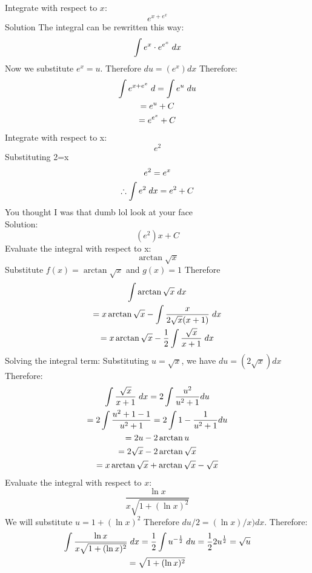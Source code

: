 \documentclass{article}
\begin{document}
Integrate with respect to $x$: $$e^{x+e^{x}}$$
Solution
The integral can be rewritten this way:
$$\int e^x\cdot e^{e^{x}}\hspace{1mm}dx$$
Now we substitute $e^x=u$. Therefore $du=(e^x)dx$
Therefore:
\begin{gather*}
   \int e^{x+e^{x}} \hspace{1mm}d=\int e^u\hspace{1mm}du
   \\=e^u+C
   \\=e^{e^x}+C
\end{gather*}
Integrate with respect to x: $$e^2$$
Substituting 2=x
\begin{gather*}
    e^2=e^x
    \\\therefore \int e^2 \hspace{1mm}dx=e^2+C
\end{gather*}
You thought I was that dumb lol look at your face
\\Solution:$$(e^2)x+C$$
Evaluate the integral with respect to x:$$\arctan{\sqrt{x}}$$
Substitute $f(x)=\arctan{\sqrt{x}}$ and $g(x)=1$
Therefore
\begin{gather*}
\int \arctan{\sqrt{x}} \hspace{1mm}dx
\\=x\arctan{\sqrt{x}}-\int \frac{x}{2\sqrt{x}(x+1)} \hspace{1mm}dx
\\=x\arctan{\sqrt{x}}-\frac{1}{2}\int \frac{\sqrt{x}}{x+1}\hspace{1mm}dx
\end{gather*}
Solving the integral term:
Substituting $u=\sqrt{x}$, we have $du=(2\sqrt{x})dx$ Therefore:
\begin{gather*}
\int \frac{\sqrt{x}}{x+1}\hspace{1mm}dx=2\int\frac{u^2}{u^2+1}du
\\=2\int\frac{u^2+1-1}{u^2+1}=2\int1-\frac{1}{u^2+1}du
\\=2u-2\arctan{u}
\\=2\sqrt{x}-2\arctan{\sqrt{x}}
\\=x\arctan{\sqrt{x}}+\arctan{\sqrt{x}}-\sqrt{x}
\end{gather*}
Evaluate the integral with respect to $x$:
$$\frac{\ln{x}}{x\sqrt{1+(\ln{x})^2}}$$
We will substitute $u=1+(\ln{x})^2$ Therefore $du/2=(\ln{x})/x)dx$. Therefore:
\begin{gather*}
\int \frac{\ln{x}}{x\sqrt{1+(\ln{x})^2}}\hspace{1mm}dx=\frac{1}{2}\int u^{-\frac{1}{2}}\hspace{1mm}du
=\frac{1}{2}2u^{\frac{1}{2}}=\sqrt{u}
\\=\sqrt{1+(\ln{x})^2}
\end{gather*}
\end{document}
